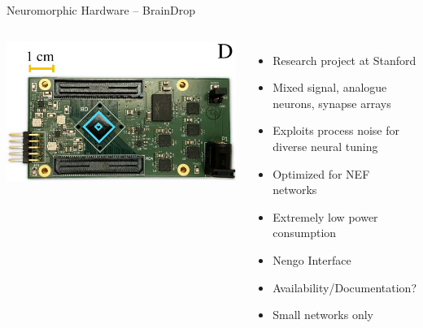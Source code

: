 \documentclass[handout,aspectratio=169]{beamer}
\begin{document}
\begin{frame}{Neuromorphic Hardware -- BrainDrop}
	\centering
	\begin{columns}
		\includegraphics[width=\textwidth]{media/necka1abcd-2881432-large_2.jpg}\\[0.5cm]
		\begin{itemize}
			\setlength{\itemsep}{0.25cm}
			\item Research project at Stanford
			\item Mixed signal, analogue neurons, synapse arrays
			\item Exploits process noise for diverse neural tuning
			\item Optimized for NEF networks
			\item<2->[\OPlus] Extremely low power consumption
			\item<2->[\OPlus] Nengo Interface
			\item<2->[\OMeh] Availability/Documentation?
			\item<2->[\OMinus] Small networks only
		\end{itemize}
	\end{columns}
\end{frame}
\end{document}
